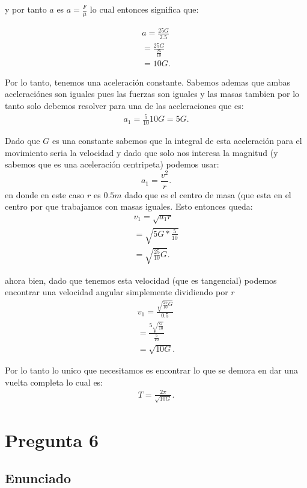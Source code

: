 \documentclass[12pt]{article}
\begin{document}
y por tanto $a$ es $a = \frac{F}{\mu}$ lo cual entonces significa que:

\begin{align*}
  a = \frac{25G}{2.5}\\
  = \frac{25G}{\frac{25}{10}}\\
  = 10G
.\end{align*}

Por lo tanto, tenemos una aceleración constante. Sabemos ademas que ambas aceleraciónes son iguales pues las fuerzas son iguales y las masas tambien por lo tanto solo debemos resolver para una de las aceleraciones que es:
\begin{align*}
  a_1 = \frac{5}{10}10G = 5G
.\end{align*}

Dado que $G$ es una constante sabemos que la integral de esta aceleración para el movimiento seria la velocidad y dado que solo nos interesa la magnitud (y sabemos que es una aceleración centripeta) podemos usar: \[
a_1 = \frac{v^2}{r}
.\] en donde en este caso $r$ es $0.5 m$ dado que es el centro de masa (que esta en el centro por que trabajamos con masas iguales. Esto entonces queda:
\begin{align*}
  v_1 = \sqrt{a_1r} \\
  = \sqrt{5G*\frac{5}{10}} \\
  = \sqrt{\frac{25}{10}G} 
.\end{align*}

ahora bien, dado que tenemos esta velocidad (que es tangencial) podemos encontrar una velocidad angular simplemente dividiendo por $r$ 
\begin{align*}
  v_1 = \frac{\sqrt{\frac{25}{10}G} }{0.5}\\
  = \frac{5 \sqrt{\frac{G}{10}} }{\frac{5}{10}}\\
  = \sqrt{10G}
.\end{align*}

Por lo tanto lo unico que necesitamos es encontrar lo que se demora en dar una vuelta completa lo cual es:
\begin{align*}
  T = \frac{2\pi}{\sqrt{10G}}
.\end{align*}

\section*{Pregunta 6}

\subsection*{Enunciado}
\end{document}
